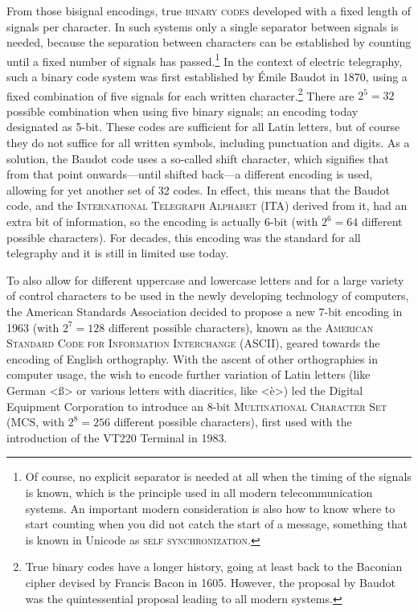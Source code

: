 From those bisignal encodings, true \textsc{binary codes} developed with a fixed
length of signals per character. In such systems only a single separator between
signals is needed, because the separation between characters can be established
by counting until a fixed number of signals has passed.\footnote{Of course, no
explicit separator is needed at all when the timing of the signals is known, which is
the principle used in all modern telecommunication systems. An important modern
consideration is also how to know where to start counting when you did not catch
the start of a message, something that is known in Unicode as \textsc{self
synchronization}.} In the context of electric telegraphy, such a binary code
system was first established by Émile Baudot in 1870, using a fixed combination
of five signals for each written character.\footnote{True binary codes have a
longer history, going at least back to the Baconian cipher devised by Francis
Bacon in 1605. However, the proposal by Baudot was the quintessential proposal
leading to all modern systems.} There are $2^5 = 32$ possible combination when
using five binary signals; an encoding today designated as 5-bit. These
codes are sufficient for all Latin letters, but of course they do not suffice
for all written symbols, including punctuation and digits. As a solution, the
Baudot code uses a so-called shift character, which signifies that from
that point onwards---until shifted back---a different encoding is used, allowing
for yet another set of 32 codes. In effect, this means that the Baudot code, and
the \textsc{International Telegraph Alphabet} (ITA) derived from it, had an
extra bit of information, so the encoding is actually 6-bit (with $2^6
= 64$ different possible characters). For decades, this encoding was the
standard for all telegraphy and it is still in limited use today.

To also allow for different uppercase and lowercase letters and for a large
variety of control characters to be used in the newly developing technology of
computers, the American Standards Association decided to propose a new 7-bit
encoding in 1963 (with $2^7 = 128$ different possible characters), known as the
\textsc{American Standard Code for Information Interchange} (ASCII), geared
towards the encoding of English orthography. With the ascent of other
orthographies in computer usage, the wish to encode further variation of Latin
letters (like German <ß> or various letters with diacritics, like <è>) led the
Digital Equipment Corporation to introduce an 8-bit \textsc{Multinational
Character Set} (MCS, with $2^8 = 256$ different possible characters), first used
with the introduction of the VT{\large 220} Terminal in 1983. 

